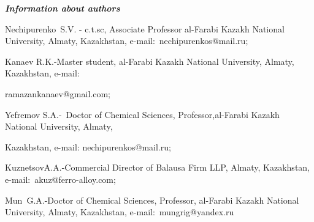 \emph{{\bfseries Information about authors}}

\begin{noparindent}
Nechipurenko~S.V. - c.t.sc, Associate Professor al-Farabi Kazakh
National University, Almaty, Kazakhstan, e-mail:~nechipurenkos@mail.ru;

Kanaev R.K.-Master student, al-Farabi Kazakh National University,
Almaty, Kazakhstan, e-mail:

ramazankanaev@gmail.com;

Yefremov S.A.-~Doctor of Chemical Sciences, Professor,al-Farabi Kazakh
National University, Almaty,

Kazakhstan, e-mail: nechipurenkos@mail.ru;

KuznetsovA.A.-Commercial Director of Balausa Firm LLP, Almaty,
Kazakhstan, e-mail:~akuz@ferro-alloy.com;

Mun~G.A.-Doctor of Chemical Sciences, Professor, al-Farabi Kazakh
National University, Almaty, Kazakhstan, e-mail:~mungrig@yandex.ru
\end{noparindent}
